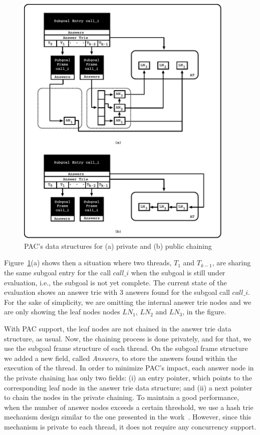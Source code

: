 \documentclass{llncs}
\begin{document}
\begin{figure}[!ht]
\centering
\includegraphics[width=10.5cm]{figures/pcc.pdf}
\caption{PAC's data structures for (a) private and (b) public
  chaining}
\label{fig_tabtries_pcc}
\end{figure}

Figure~\ref{fig_tabtries_pcc}(a) shows then a situation where two
threads, $T_1$ and $T_{k-1}$, are sharing the same subgoal entry for
the call $call\_i$ when the subgoal is still under evaluation, i.e.,
the subgoal is not yet complete. The current state of the evaluation
shows an answer trie with 3 answers found for the subgoal call
$call\_i$. For the sake of simplicity, we are omitting the internal
answer trie nodes and we are only showing the leaf nodes nodes $LN_1$,
$LN_2$ and $LN_3$, in the figure.

With PAC support, the leaf nodes are not chained in the answer trie
data structure, as usual. Now, the chaining process is done privately,
and for that, we use the subgoal frame structure of each thread. On
the subgoal frame structure we added a new field, called
\emph{Answers}, to store the answers found within the execution of the
thread. In order to minimize PAC's impact, each answer node in the
private chaining has only two fields: (i) an entry pointer, which
points to the corresponding leaf node in the answer trie data
structure; and (ii) a next pointer to chain the nodes in the private
chaining. To maintain a good performance, when the number of answer
nodes exceeds a certain threshold, we use a hash trie mechanism design
similar to the one presented in the
work~\cite{Areias-ijpp15}. However, since this mechanism is private to
each thread, it does not require any concurrency support.
\end{document}
